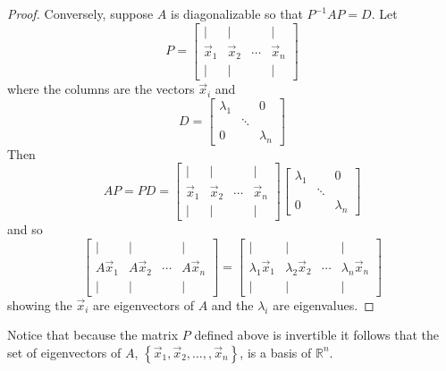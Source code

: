 \documentclass{ximera}
\begin{document}
\begin{proof}
Conversely, suppose $A$ is diagonalizable so that $P^{-1}AP=D.$ Let
\begin{equation*}
P=\begin{bmatrix}
| & | &   & | \\
\vec{x}_1 & \vec{x}_2  & \cdots & \vec{x}_n \\
| & | &   & |
\end{bmatrix}
\end{equation*}
 where the columns are the vectors $\vec{x}_i$ and
\begin{equation*}
D=\begin{bmatrix}
\lambda _{1} &  & 0 \\
& \ddots &  \\
0 &  & \lambda _{n}
\end{bmatrix}
\end{equation*}
Then
\begin{equation*}
AP=PD=\begin{bmatrix}
| & | &   & | \\
\vec{x}_1 & \vec{x}_2  & \cdots & \vec{x}_n \\
| & | &   & |
\end{bmatrix} \begin{bmatrix}
\lambda _{1} &  & 0 \\
& \ddots &  \\
0 &  & \lambda _{n}
\end{bmatrix}
\end{equation*}
and so
\begin{equation*}
\begin{bmatrix}
| & | &   & | \\
A\vec{x}_1 & A\vec{x}_2  & \cdots & A\vec{x}_n \\
| & | &   & |
\end{bmatrix} =\begin{bmatrix}
| & | &   & | \\
\lambda _{1}\vec{x}_1 & \lambda _{2}\vec{x}_2 & \cdots & \lambda_{n}\vec{x}_n \\
| & | &   & | 
\end{bmatrix}
\end{equation*}
showing the $\vec{x}_i$ are eigenvectors of $A$ and the $\lambda _{i}$
are eigenvalues.
\end{proof}

Notice that because the matrix $P$ defined above is invertible it follows that the set of eigenvectors of $A$, $\left\{ \vec{x}_1 , \vec{x}_2 , \ldots, , \vec{x}_n  \right\}$, is a basis of $\mathbb{R}^n$.
\end{document}
